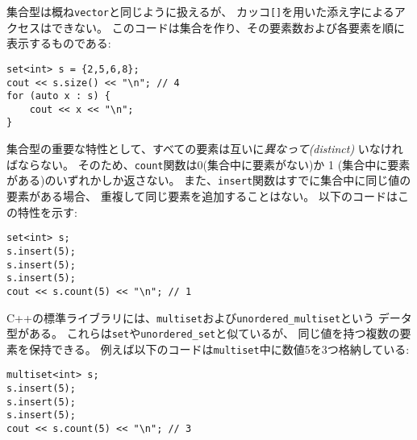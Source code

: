 集合型は概ね\texttt{vector}と同じように扱えるが、
カッコ\texttt{[]}を用いた添え字によるアクセスはできない。
このコードは集合を作り、その要素数および各要素を順に
表示するものである:

\begin{lstlisting}
set<int> s = {2,5,6,8};
cout << s.size() << "\n"; // 4
for (auto x : s) {
    cout << x << "\n";
}
\end{lstlisting}

\begin{comment}
An important property of sets is
that all their elements are \emph{distinct}.
Thus, the function \texttt{count} always returns
either 0 (the element is not in the set)
or 1 (the element is in the set),
and the function \texttt{insert} never adds
an element to the set if it is
already there.
The following code illustrates this:
\end{comment}

集合型の重要な特性として、すべての要素は互いに\emph{異なって(distinct)}
いなければならない。
そのため、\texttt{count}関数は0(集合中に要素がない)か
1 (集合中に要素がある)のいずれかしか返さない。
また、\texttt{insert}関数はすでに集合中に同じ値の要素がある場合、
重複して同じ要素を追加することはない。
以下のコードはこの特性を示す:

\begin{lstlisting}
set<int> s;
s.insert(5);
s.insert(5);
s.insert(5);
cout << s.count(5) << "\n"; // 1
\end{lstlisting}

\begin{comment}
C++ also contains the structures
\texttt{multiset} and \texttt{unordered\_multiset}
that otherwise work like \texttt{set}
and \texttt{unordered\_set}
but they can contain multiple instances of an element.
For example, in the following code all three instances
of the number 5 are added to a multiset:
\end{comment}

C++の標準ライブラリには、\texttt{multiset}および\texttt{unordered\_multiset}という
データ型がある。
これらは\texttt{set}や\texttt{unordered\_set}と似ているが、
同じ値を持つ複数の要素を保持できる。
例えば以下のコードは\texttt{multiset}中に数値5を3つ格納している:

\begin{lstlisting}
multiset<int> s;
s.insert(5);
s.insert(5);
s.insert(5);
cout << s.count(5) << "\n"; // 3
\end{lstlisting}

\begin{comment}
The function \texttt{erase} removes
all instances of an element
from a multiset:
\end{comment}


